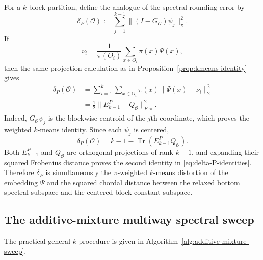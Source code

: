 \documentclass[11pt]{article}
\newcommand{\1}{\mathbf{1}}
\begin{document}
For a $k$-block partition, define the analogue of the spectral
rounding error by
\begin{equation}
    \delta_P(\mathcal O)
    :=\sum_{j=1}^{k-1}
      \|(I-G_{\mathcal O})\psi_j\|_\pi^2.
    \label{eq:delta-P}
\end{equation}
If
\[
    \nu_i
    =\frac1{\pi(O_i)}
      \sum_{x\in O_i}\pi(x)\Psi(x),
\]
then the same projection calculation as in
Proposition~\ref{prop:kmeans-identity} gives
\begin{equation}
\begin{split}
    \delta_P(\mathcal O)
    &=\sum_{i=1}^k\sum_{x\in O_i}
      \pi(x)\|\Psi(x)-\nu_i\|_2^2\\
    &=\frac12\|E_{k-1}^P-Q_{\mathcal O}\|_{F,\pi}^2.
\end{split}
    \label{eq:delta-P-identities}
\end{equation}
Indeed, $G_{\mathcal O}\psi_j$ is the blockwise centroid of the
$j$th coordinate, which proves the weighted $k$-means identity.
Since each $\psi_j$ is centered,
\[
    \delta_P(\mathcal O)
    =k-1-\operatorname{Tr}(E_{k-1}^P Q_{\mathcal O}).
\]
Both $E_{k-1}^P$ and $Q_{\mathcal O}$ are orthogonal projections of
rank $k-1$, and expanding their squared Frobenius distance proves
the second identity in \eqref{eq:delta-P-identities}.  Therefore
$\delta_P$ is simultaneously the $\pi$-weighted $k$-means
distortion of the embedding $\Psi$ and the squared chordal distance
between the relaxed bottom spectral subspace and the centered
block-constant subspace.

\subsection{The additive-mixture multiway spectral sweep}

The practical general-$k$ procedure is given in
Algorithm~\ref{alg:additive-mixture-sweep}.
\end{document}

